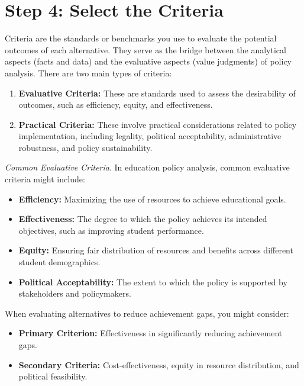 \documentclass{article}
\theoremstyle{definition}
\theoremstyle{plain}
\begin{document}
\section{Step 4: Select the Criteria}

Criteria are the standards or benchmarks you use to evaluate the potential
outcomes of each alternative. They serve as the bridge between the analytical
aspects (facts and data) and the evaluative aspects (value judgments) of policy
analysis. There are two main types of criteria:

\begin{enumerate}[label=\arabic*.]
    \item \textbf{Evaluative Criteria:} These are standards used to assess the desirability of outcomes, such as efficiency, equity, and effectiveness.
    
    \item \textbf{Practical Criteria:} These involve practical considerations related to policy implementation, including legality, political acceptability, administrative robustness, and policy sustainability.
\end{enumerate}

\textit{Common Evaluative Criteria}. In education policy analysis, common
evaluative criteria might include: 

\begin{itemize}
    \item \textbf{Efficiency:} Maximizing the use of resources to achieve educational goals.
    
    \item \textbf{Effectiveness:} The degree to which the policy achieves its intended objectives, such as improving student performance.
    
    \item \textbf{Equity:} Ensuring fair distribution of resources and benefits across different student demographics.
    
    \item \textbf{Political Acceptability:} The extent to which the policy is supported by stakeholders and policymakers.
\end{itemize}

\begin{tcolorbox}[colback=gray!5!white, colframe=gray!75!black, title=Example: Criteria for Reducing Achievement Gaps]

When evaluating alternatives to reduce achievement gaps, you might consider:

\begin{itemize}
    \item \textbf{Primary Criterion:} Effectiveness in significantly reducing achievement gaps.
    
    \item \textbf{Secondary Criteria:} Cost-effectiveness, equity in resource distribution, and political feasibility.
\end{itemize}
\end{tcolorbox}
\end{document}
